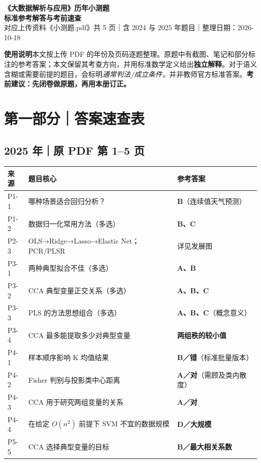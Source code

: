 \documentclass[UTF8,a4paper,11pt]{ctexart}
\newcommand{\A}[1]{{\bfseries\color{teal}#1}}
\begin{document}
\begin{center}
{\sffamily\fontsize{20}{25}\selectfont\bfseries\color{navy}《大数据解析与应用》历年小测题}\\[3pt]
{\sffamily\Large\bfseries\color{teal}标准参考解答与考前速查}\\[7pt]
{\color{muted}\small 对应上传资料《小测题.pdf》共 5 页｜含 2024 与 2025 年题目｜整理日期：2026-10-18}
\end{center}
\vspace{2pt}
\begin{note}
\textbf{使用说明}\quad 本文按上传 PDF 的年份及页码逐题整理。原题中有截图、笔记和部分标注的参考答案；本文保留其考查方向，并用标准数学定义给出\textbf{独立解释}。对于语义含糊或需要前提的题目，会标明\emph{通常判法/成立条件}，并非教师官方标准答案。\textbf{考前建议：先闭卷做原题，再用本册订正。}
\end{note}
\section*{第一部分｜答案速查表}
\subsection*{2025 年｜原 PDF 第 1--5 页}
\noindent\begin{tabularx}{\textwidth}{>{\centering\arraybackslash}p{18mm}X>{\centering\arraybackslash}p{25mm}}
\toprule
来源 & 题目核心 & 参考答案\\ \midrule
P1-1 & 哪种场景适合回归分析？ & \A{B}（连续值天气预测）\\
P1-2 & 数据归一化常用方法（多选） & \A{B、C}\\
P2-3 & OLS→Ridge→Lasso→Elastic Net；PCR/PLSR & 详见发展图\\
P3-1 & 两种典型拟合不佳（多选） & \A{A、B}\\
P3-2 & CCA 典型变量正交关系（多选） & \A{A、B、C}\\
P3-3 & PLS 的方法思想组合（多选） & \A{A、B、C}（概念意义）\\
P3-4 & CCA 最多能提取多少对典型变量 & \A{两组秩的较小值}\\
P4-1 & 样本顺序影响 K 均值结果 & \A{B／错}（标准批量版本）\\
P4-2 & Fisher 判别与投影类中心距离 & \A{A／对}（需顾及类内散度）\\
P4-3 & CCA 用于研究两组变量的关系 & \A{A／对}\\
P4-4 & 在给定 $O(n^2)$ 前提下 SVM 不宜的数据规模 & \A{D／大规模}\\
P5-5 & CCA 选择典型变量的目标 & \A{B／最大相关系数}\\
\bottomrule
\end{tabularx}
\end{document}
